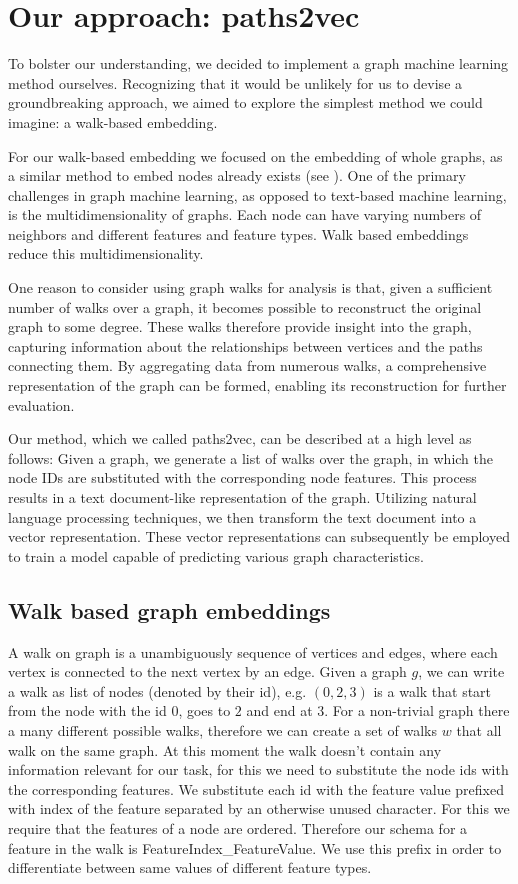 \section{Our approach: paths2vec}

To bolster our understanding, we decided to implement a graph machine learning method ourselves. Recognizing that it would be unlikely for us to devise a groundbreaking approach, we aimed to explore the simplest method we could imagine: a walk-based embedding.

For our walk-based embedding we focused on the embedding of whole graphs, as a similar method to embed nodes already exists (see \cite{2016node2vec}). One of the primary challenges in graph machine learning, as opposed to text-based machine learning, is the multidimensionality of graphs. Each node can have varying numbers of neighbors and different features and feature types. Walk based embeddings reduce this multidimensionality.

One reason to consider using graph walks for analysis is that, given a sufficient number of walks over a graph, it becomes possible to reconstruct the original graph to some degree\cite{Wittmann2009reconstruction}. These walks therefore provide insight into the graph, capturing information about the relationships between vertices and the paths connecting them. By aggregating data from numerous walks, a comprehensive representation of the graph can be formed, enabling its reconstruction for further evaluation.

Our method, which we called paths2vec, can be described at a high level as follows: Given a graph, we generate a list of walks over the graph, in which the node IDs are substituted with the corresponding node features. This process results in a text document-like representation of the graph. Utilizing natural language processing techniques, we then transform the text document into a vector representation. These vector representations can subsequently be employed to train a model capable of predicting various graph characteristics.

\subsection{Walk based graph embeddings}
A walk on graph is a unambiguously sequence of vertices and edges, where each vertex is connected to the next vertex by an edge. Given a graph $g$, we can write a walk as list of nodes (denoted by their id), e.g. $(0, 2, 3)$ is a walk that start from the node with the id $0$, goes to $2$ and end at $3$. For a non-trivial graph there a many different possible walks, therefore we can create a set of walks $w$ that all walk on the same graph. At this moment the walk doesn't contain any information relevant for our task, for this we need to substitute the node ids with the corresponding features. We substitute each id with the feature value prefixed with index of the feature separated by an otherwise unused character. For this we require that the features of a node are ordered. Therefore our schema for a feature in the walk is FeatureIndex\_FeatureValue. We use this prefix in order to differentiate between same values of different feature types.

